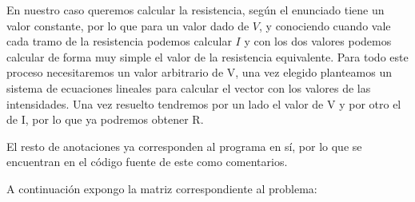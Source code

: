 \documentclass[12pt,thmsa]{article}
\begin{document}
En nuestro caso queremos calcular la resistencia, seg\'{u}n el enunciado
tiene un valor constante, por lo que para un valor dado de $V$, y conociendo
cuando vale cada tramo de la resistencia podemos calcular $I$ y con los dos
valores podemos calcular de forma muy simple el valor de la resistencia
equivalente. Para todo este proceso necesitaremos un valor arbitrario de V,
una vez elegido planteamos un sistema de ecuaciones lineales para calcular
el vector con los valores de las intensidades. Una vez resuelto tendremos
por un lado el valor de V y por otro el de I, por lo que ya podremos obtener
R.

\vspace{1pt}

El resto de anotaciones ya corresponden al programa en s\'{i}, por lo que se
encuentran en el c\'{o}digo fuente de este como comentarios.

\vspace{1pt}

A continuaci\'{o}n expongo la matriz correspondiente al problema:
\end{document}
